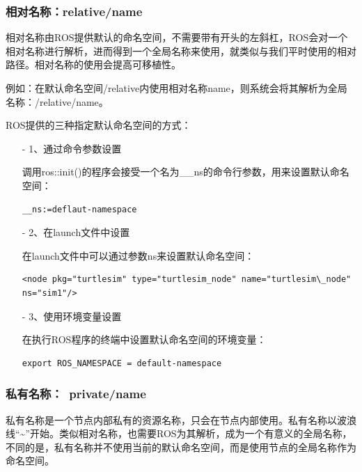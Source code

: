 \documentclass[9pt, oneside]{book}
\begin{document}
\subsubsection{相对名称：relative/name}

相对名称由ROS提供默认的命名空间，不需要带有开头的左斜杠，ROS会对一个相对名称进行解析，进而得到一个全局名称来使用，就类似与我们平时使用的相对路径。相对名称的使用会提高可移植性。

例如：在默认命名空间/relative内使用相对名称name，则系统会将其解析为全局名称：/relative/name。

ROS提供的三种指定默认命名空间的方式：

\begin{itemize}
    \item[-] 1、通过命令参数设置

    调用ros::init()的程序会接受一个名为\_\_ns的命令行参数，用来设置默认命名空间：

\begin{verbatim}
__ns:=deflaut-namespace
\end{verbatim}

    \item[-] 2、在launch文件中设置
    
    在launch文件中可以通过参数ns来设置默认命名空间：

\begin{verbatim}
<node pkg="turtlesim" type="turtlesim_node" name="turtlesim\_node" ns="sim1"/>
\end{verbatim}

    \item[-] 3、使用环境变量设置
    
    在执行ROS程序的终端中设置默认命名空间的环境变量：

\begin{verbatim}
export ROS_NAMESPACE = default-namespace
\end{verbatim}


\end{itemize}

\subsubsection{私有名称：~private/name}

私有名称是一个节点内部私有的资源名称，只会在节点内部使用。私有名称以波浪线“\textasciitilde”开始。类似相对名称，也需要ROS为其解析，成为一个有意义的全局名称，不同的是，私有名称并不使用当前的默认命名空间，而是使用节点的全局名称作为命名空间。
\end{document}
